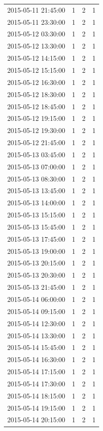 \begin{tabular}{lrrr}
2015-05-11 21:45:00 & 1 & 2 & 1 \\
2015-05-11 23:30:00 & 1 & 2 & 1 \\
2015-05-12 03:30:00 & 1 & 2 & 1 \\
2015-05-12 13:30:00 & 1 & 2 & 1 \\
2015-05-12 14:15:00 & 1 & 2 & 1 \\
2015-05-12 15:15:00 & 1 & 2 & 1 \\
2015-05-12 16:30:00 & 1 & 2 & 1 \\
2015-05-12 18:30:00 & 1 & 2 & 1 \\
2015-05-12 18:45:00 & 1 & 2 & 1 \\
2015-05-12 19:15:00 & 1 & 2 & 1 \\
2015-05-12 19:30:00 & 1 & 2 & 1 \\
2015-05-12 21:45:00 & 1 & 2 & 1 \\
2015-05-13 03:45:00 & 1 & 2 & 1 \\
2015-05-13 07:00:00 & 1 & 2 & 1 \\
2015-05-13 08:30:00 & 1 & 2 & 1 \\
2015-05-13 13:45:00 & 1 & 2 & 1 \\
2015-05-13 14:00:00 & 1 & 2 & 1 \\
2015-05-13 15:15:00 & 1 & 2 & 1 \\
2015-05-13 15:45:00 & 1 & 2 & 1 \\
2015-05-13 17:45:00 & 1 & 2 & 1 \\
2015-05-13 19:00:00 & 1 & 2 & 1 \\
2015-05-13 20:15:00 & 1 & 2 & 1 \\
2015-05-13 20:30:00 & 1 & 2 & 1 \\
2015-05-13 21:45:00 & 1 & 2 & 1 \\
2015-05-14 06:00:00 & 1 & 2 & 1 \\
2015-05-14 09:15:00 & 1 & 2 & 1 \\
2015-05-14 12:30:00 & 1 & 2 & 1 \\
2015-05-14 13:30:00 & 1 & 2 & 1 \\
2015-05-14 15:45:00 & 1 & 2 & 1 \\
2015-05-14 16:30:00 & 1 & 2 & 1 \\
2015-05-14 17:15:00 & 1 & 2 & 1 \\
2015-05-14 17:30:00 & 1 & 2 & 1 \\
2015-05-14 18:15:00 & 1 & 2 & 1 \\
2015-05-14 19:15:00 & 1 & 2 & 1 \\
2015-05-14 20:15:00 & 1 & 2 & 1 \\

\end{tabular}
